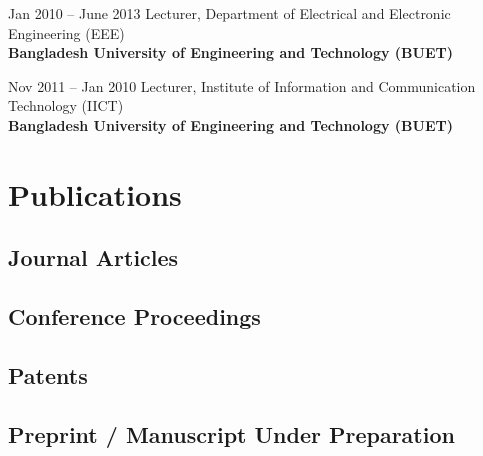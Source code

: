 \documentclass[cvauthor={Dr. Sajid Muhaimin Choudhury}]{buetcv}
\begin{document}
        \begin{twocolentry}{
            Jan 2010 – June 2013
            }
            Lecturer, Department of Electrical and Electronic Engineering (EEE) \\ \textbf{Bangladesh University of Engineering and Technology (BUET)}\\
        \end{twocolentry}

        \begin{twocolentry}{
            Nov 2011 – Jan 2010
            }
            Lecturer, Institute of Information and Communication Technology (IICT) \\ \textbf{Bangladesh University of Engineering and Technology (BUET)}\\
        \end{twocolentry}        
    
\section{Publications}
\vspace{0.2 cm}
   
\subsection{Journal Articles}
\nocite{*}
\newrefcontext[labelprefix=J]
\printbibliography[env=counter,type=article,heading=none]
\printbibliography[type=article,heading=none]

\subsection{Conference Proceedings}
\nocite{*}
\newrefcontext[labelprefix=C]
\printbibliography[env=counter,type=inproceedings,heading=none]
\printbibliography[type=inproceedings,heading=none]


\subsection{Patents}
\nocite{*}
\newrefcontext[labelprefix=P]
\printbibliography[env=counter,type=patent,heading=none]
\printbibliography[type=patent,heading=none]

\subsection{Preprint / Manuscript Under Preparation}
\nocite{*}
\newrefcontext[labelprefix=X]
\printbibliography[env=counter,type=unpublished,heading=none]
\printbibliography[type=unpublished,heading=none]
\end{document}
